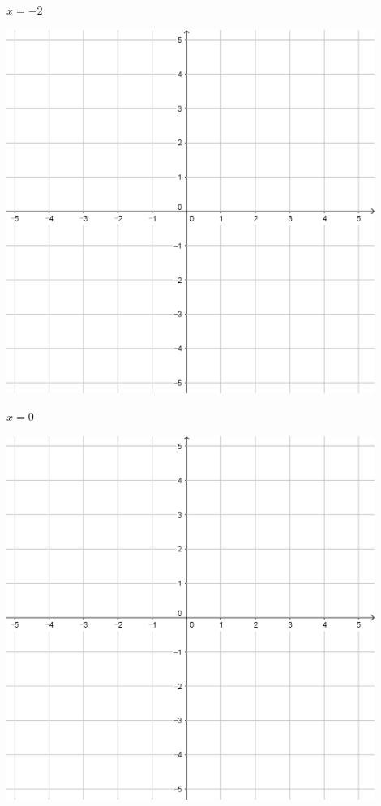 \documentclass[a4paper]{oblivoir}
\begin{document}
\begin{minipage}{0.45\textwidth}\centering
\(x=-2\)
\par\bigskip\includegraphics[width=0.9\textwidth]{55}
\end{minipage}
\begin{minipage}{0.45\textwidth}\centering
\(x=0\)
\par\bigskip\includegraphics[width=0.9\textwidth]{55}
\end{minipage}\bigskip\bigskip\par
\end{document}
